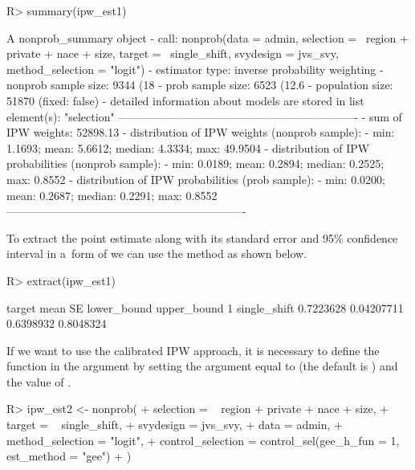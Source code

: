 \documentclass[
]{jss}
\begin{document}
\begin{CodeChunk}
\begin{CodeInput}
R> summary(ipw_est1)
\end{CodeInput}
\begin{CodeOutput}
A nonprob_summary object
 - call: nonprob(data = admin, selection = ~region + private + nace + 
    size, target = ~single_shift, svydesign = jvs_svy, 
    method_selection = "logit")
 - estimator type: inverse probability weighting
 - nonprob sample size: 9344 (18%
 - prob sample size: 6523 (12.6%
 - population size: 51870 (fixed: false)
 - detailed information about models are stored in list element(s): 
    "selection"
----------------------------------------------------------------
 - sum of IPW weights: 52898.13 
 - distribution of IPW weights (nonprob sample):
   - min: 1.1693; mean: 5.6612; median: 4.3334; max: 49.9504
 - distribution of IPW probabilities (nonprob sample):
   - min: 0.0189; mean: 0.2894; median: 0.2525; max: 0.8552
 - distribution of IPW probabilities (prob sample):
   - min: 0.0200; mean: 0.2687; median: 0.2291; max: 0.8552
----------------------------------------------------------------
\end{CodeOutput}
\end{CodeChunk}

To extract the point estimate along with its standard error and 95\%
confidence interval in a~form of  we can use the
 method as shown below.

\begin{CodeChunk}
\begin{CodeInput}
R> extract(ipw_est1)
\end{CodeInput}
\begin{CodeOutput}
        target      mean         SE lower_bound upper_bound
1 single_shift 0.7223628 0.04207711   0.6398932   0.8048324
\end{CodeOutput}
\end{CodeChunk}

If we want to use the calibrated IPW approach, it is necessary to define
the  function in the 
argument by setting the  argument equal to 
(the default is ) and the value of .

\begin{CodeChunk}
\begin{CodeInput}
R> ipw_est2 <- nonprob(
+   selection = ~ region + private + nace + size,
+   target = ~ single_shift,
+   svydesign = jvs_svy,
+   data = admin,
+   method_selection = "logit",
+   control_selection = control_sel(gee_h_fun = 1, est_method = "gee")
+ )
\end{CodeInput}
\end{CodeChunk}
\end{document}
